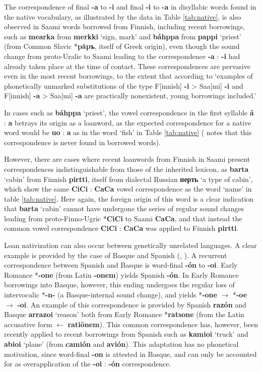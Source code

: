 \documentclass[svgnames,12pt]{scrartcl}
\newcommand{\ipa}[1]{\textbf{{\phon\mbox{#1}}}}
\begin{document}
The correspondence of final \ipa{-a} to \ipa{-i} and final \ipa{-i} to \ipa{-a} in disyllabic words found in the native vocabulary, as illustrated by the data in Table \ref{tab:native}, is also observed in Saami words borrowed from Finnish, including recent borrowings, such as \ipa{mearka} from \ipa{merkki} `sign, mark' and \ipa{báhppa} from \ipa{pappi} `priest' (from Common Slavic *\ipa{păpъ}, itself of Greek origin), even though the sound change from proto-Uralic to Saami leading to the correspondence \ipa{-a} : \ipa{-i} had already taken place at the time of contact. These correspondences are pervasive even in the most recent borrowings, to the extent that according to \citet[36]{aikio06nativization} `examples of phonetically unmarked substitutions of the type F[innish] \ipa{-i} > Saa[mi] \ipa{-i} and F[innish] \ipa{-a} > Saa[mi] \ipa{-a} are practically nonexistent, young borrowings included.'

In cases such as \ipa{báhppa} `priest', the vowel correspondence in the first syllable \ipa{á} : \ipa{a} betrays its origin as a loanword, as the expected correspondence for a native word would be \ipa{uo} : \ipa{a} as in the word `fish' in Table \ref{tab:native} (\citealt[35]{aikio06nativization} notes that this correspondence is never found in borrowed words).

However, there are cases where recent loanwords from Finnish in Saami present correspondences indistinguishable from those of the inherited lexicon, as \ipa{barta} `cabin' from Finnish \ipa{pirtti}, itself from dialectal Russian \ipa{перть} `a type of cabin', which show the same \ipa{CiCi} : \ipa{CaCa} vowel correspondence as the word `name' in table \ref{tab:native}. Here again, the foreign origin of this word is a clear indication that \ipa{barta} `cabin' cannot have undergone the series of regular sound changes leading from proto-Finno-Ugric *\ipa{CiCi} to Saami \ipa{CaCa}, and that instead the common vowel correspondence \ipa{CiCi} : \ipa{CaCa} was applied to Finnish \ipa{pirtti}.
 
Loan nativization can also occur between genetically unrelated languages. A clear example is provided by the case of Basque and Spanish (\citealt[53-54]{trask00chronology}, \citealt[21-3]{aikio06nativization}). 
A recurrent correspondence between Spanish and Basque is word-final \ipa{-ón} to \ipa{-oi}. Early Romance *\ipa{-one} (from Latin \ipa{-onem}) yields Spanish \ipa{-ón}. In Early Romance borrowings into Basque, however, this ending undergoes the regular loss of intervocalic *\ipa{-n-} (a Basque-internal sound change), and yields *\ipa{-one} $\rightarrow$ *\ipa{-oe} $\rightarrow$ \ipa{-oi}. An example of this correspondence is provided by Spanish \ipa{razón} and Basque \ipa{arrazoi} `reason' both from Early Romance *\ipa{ratsone} (from the Latin accusative form $\leftarrow$ \ipa{ratiōnem}).
This common correspondence has, however, been recently applied to recent borrowings from Spanish such as \ipa{kamioi} `truck' and \ipa{abioi} `plane' (from \ipa{camión} and \ipa{avión}). This adaptation has no phonetical motivation, since word-final \ipa{-on} is attested in Basque, and can only be accounted for as overapplication of the \ipa{-oi} : \ipa{-ón} correspondence.
 
\end{document}
